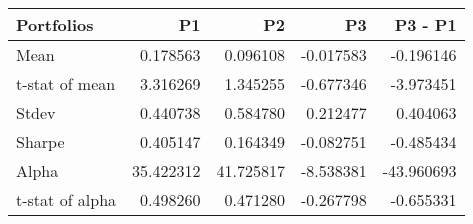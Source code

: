 \begin{tabular}{lrrrr}
\toprule
Portfolios & P1 & P2 & P3 & P3 - P1 \\
\midrule
Mean & 0.178563 & 0.096108 & -0.017583 & -0.196146 \\
t-stat of mean & 3.316269 & 1.345255 & -0.677346 & -3.973451 \\
Stdev & 0.440738 & 0.584780 & 0.212477 & 0.404063 \\
Sharpe & 0.405147 & 0.164349 & -0.082751 & -0.485434 \\
Alpha & 35.422312 & 41.725817 & -8.538381 & -43.960693 \\
t-stat of alpha & 0.498260 & 0.471280 & -0.267798 & -0.655331 \\
\bottomrule
\end{tabular}
